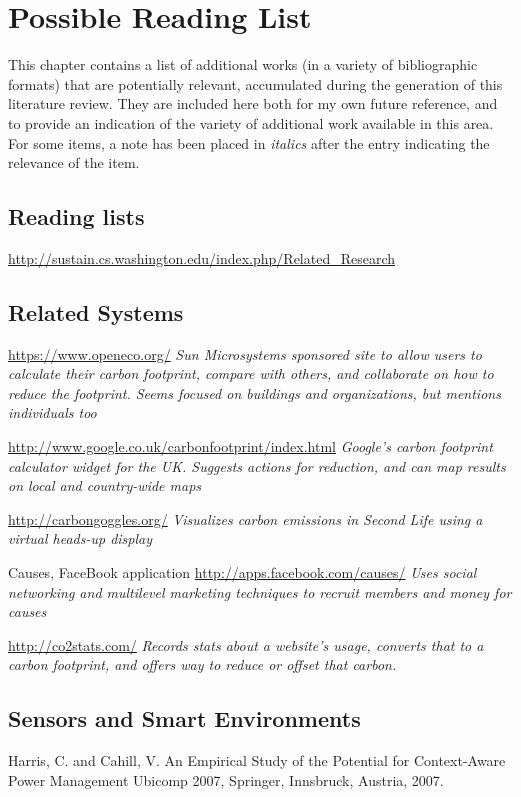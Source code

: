 \chapter{Possible Reading List}
This chapter contains a list of additional works (in a variety of bibliographic formats) that are potentially relevant, accumulated during the generation of this literature review. They are included here both for my own future reference, and to provide an indication of the variety of additional work available in this area. For some items, a note has been placed in \emph{italics} after the entry indicating the relevance of the item.

\section{Reading lists}

\url{http://sustain.cs.washington.edu/index.php/Related_Research}


\section{Related Systems}

\url{https://www.openeco.org/} \emph{Sun Microsystems sponsored site to allow users to calculate their carbon footprint, compare with others, and collaborate on how to reduce the footprint. Seems focused on buildings and organizations, but mentions individuals too}

\url{http://www.google.co.uk/carbonfootprint/index.html} \emph{Google's carbon footprint calculator widget for the UK. Suggests actions for reduction, and can map results on local and country-wide maps}

\url{http://carbongoggles.org/} \emph{Visualizes carbon emissions in Second Life using a virtual heads-up display}

Causes, FaceBook application \url{http://apps.facebook.com/causes/} \emph{Uses social networking and multilevel marketing techniques to recruit members and money for causes}

\url{http://co2stats.com/} \emph{Records stats about a website's usage, converts that to a carbon footprint, and offers way to reduce or offset that carbon.}


\section{Sensors and Smart Environments}

Harris, C. and Cahill, V. An Empirical Study of the Potential for Context-Aware Power Management Ubicomp 2007, Springer, Innsbruck, Austria, 2007.

